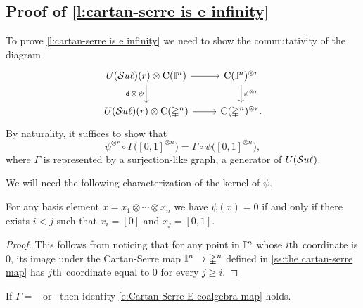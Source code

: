
\subsection{Proof of \cref{l:cartan-serre is e infinity}} \label{ss:comparison proof}

To prove \cref{l:cartan-serre is e infinity} we need to show the commutativity of the diagram
\[
\begin{tikzcd}
U(\Sl)(r) \otimes \gchains(\gcube^n) \arrow[r] \arrow[d, "\id\, \otimes\, \psi"'] &
\gchains(\gcube^n)^{\otimes r} \arrow[d, "\psi^{\otimes r}"] \\
U(\Sl)(r) \otimes \gchains(\gsimplex^n) \arrow[r] &
\gchains(\gsimplex^n)^{\otimes r}.
\end{tikzcd}
\]
By naturality, it suffices to show that
\begin{equation} \label{e:Cartan-Serre E-coalgebra map}
\psi^{\otimes r} \circ \Gamma\big( [0,1]^{\otimes n} \big) = \Gamma \circ \psi \big( [0,1]^{\otimes n} \big),
\end{equation}
where $\Gamma$ is represented by a surjection-like graph, a generator of $U(\mathcal{S}u\ell)$.

We will need the following characterization of the kernel of $\psi$.
\begin{lemma} \label{l:kernel of psi}
	For any basis element $x = x_1 \otimes \cdots \otimes x_n$ we have $\psi(x) = 0$ if and only if there exists $i < j$ such that $x_i = [0]$ and $x_j = [0,1]$. 
\end{lemma}

\begin{proof}
	This follows from noticing that for any point in $\mathbb{I}^n$ whose $i\mathrm{th}$ coordinate is $0$, its image under the Cartan-Serre map $\mathbb{I}^n \to \mathbb{\Delta}^n$ defined in \cref{ss:the cartan-serre map} has $j\mathrm{th}$ coordinate equal to $0$ for every $j \geq i$.
\end{proof}

\begin{lemma}
	If $\Gamma =$ \counit \ or \coproduct \ then identity \eqref{e:Cartan-Serre E-coalgebra map} holds.
\end{lemma}

